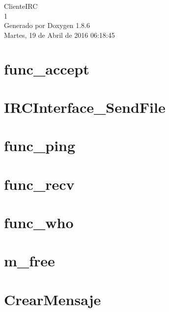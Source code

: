 \documentclass[twoside]{book}
\newcommand{\clearemptydoublepage}{%
  \newpage{\pagestyle{empty}\cleardoublepage}%
}
\begin{document}
\hypersetup{pageanchor=false}
\begin{titlepage}
\vspace*{7cm}
\begin{center}%
{\Large Cliente\-I\-R\-C \\[1ex]\large 1 }\\
\vspace*{1cm}
{\large Generado por Doxygen 1.8.6}\\
\vspace*{0.5cm}
{\small Martes, 19 de Abril de 2016 06:18:45}\\
\end{center}
\end{titlepage}
\clearemptydoublepage
\tableofcontents
\clearemptydoublepage
{}
\hypersetup{pageanchor=true}

\chapter{func\-\_\-accept}
\label{func_accept}
\hypertarget{func_accept}{}

\chapter{I\-R\-C\-Interface\-\_\-\-Send\-File}
\label{IRCInterface_SendFile}
\hypertarget{IRCInterface_SendFile}{}

\chapter{func\-\_\-ping}
\label{func_ping}
\hypertarget{func_ping}{}

\chapter{func\-\_\-recv}
\label{func_recv}
\hypertarget{func_recv}{}

\chapter{func\-\_\-who}
\label{func_who}
\hypertarget{func_who}{}

\chapter{m\-\_\-free}
\label{m_free}
\hypertarget{m_free}{}

\chapter{Crear\-Mensaje}
\label{CrearMensaje}
\hypertarget{CrearMensaje}{}

\end{document}
